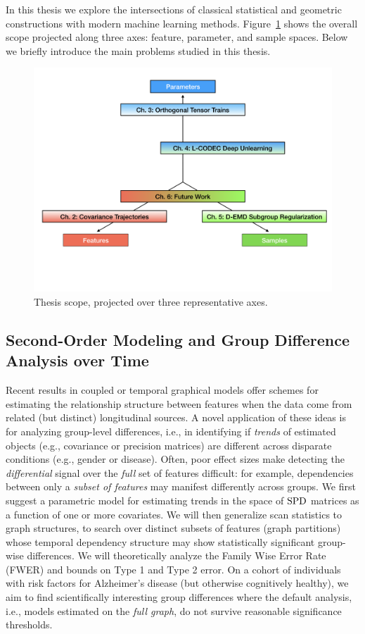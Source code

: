 In this thesis we explore the intersections of classical statistical and geometric constructions with modern machine learning methods. 
Figure~\ref{fig:scope} shows the overall scope projected along three axes: feature, parameter, and sample spaces.
Below we briefly introduce the main problems studied in this thesis.
\begin{figure}[!ht]
    \centering
    \includegraphics[width=0.95\linewidth]{_introduction/thesis_scope.png}
    \caption{Thesis scope, projected over three representative axes.}
    \label{fig:scope}
\end{figure}

\subsection{Second-Order Modeling and Group Difference Analysis over Time}

Recent results in coupled or temporal graphical models offer schemes for estimating the relationship structure 
between features when the data come from
related (but distinct) longitudinal sources. A novel application of these ideas is for analyzing group-level differences, i.e., in identifying if {\em trends} of estimated objects (e.g., 
covariance or precision matrices) are different across disparate conditions (e.g., gender or disease). Often, poor effect sizes make detecting the \textit{differential} signal 
over the {\em full} set of features difficult: for example, 
dependencies between only a {\em subset of features} may manifest differently across groups.
We first suggest
a parametric model 
for estimating trends in the space of $\text{SPD}$ matrices as a function of one or more covariates.
We will then generalize scan statistics to graph structures, 
to search over distinct subsets of features (graph partitions) whose temporal dependency structure may show statistically 
significant group-wise differences.
We will theoretically analyze the Family Wise Error Rate (FWER) and bounds on Type 1 and Type 2 error. 
On a cohort of individuals with risk factors for Alzheimer's disease (but otherwise cognitively healthy), 
we aim to 
find scientifically interesting 
group differences where the default analysis, 
i.e., models estimated on the {\em full graph}, do not survive reasonable 
significance thresholds. 


